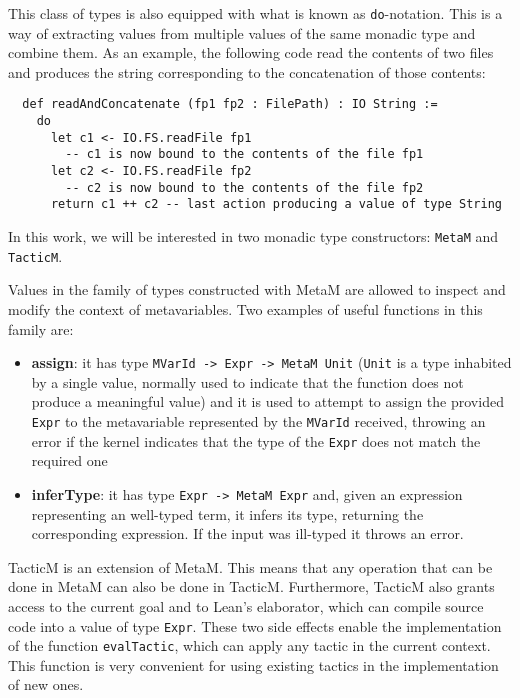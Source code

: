 This class of types is also equipped with what is known as \texttt{do}-notation. This is a way of extracting values from multiple values of the same monadic type and combine them. As an example, the following code read the contents of two files and produces the string corresponding to the concatenation of those contents:

\begin{verbatim}
  def readAndConcatenate (fp1 fp2 : FilePath) : IO String :=
    do
      let c1 <- IO.FS.readFile fp1
        -- c1 is now bound to the contents of the file fp1
      let c2 <- IO.FS.readFile fp2
        -- c2 is now bound to the contents of the file fp2
      return c1 ++ c2 -- last action producing a value of type String
\end{verbatim}

In this work, we will be interested in two monadic type constructors: \texttt{MetaM} and \texttt{TacticM}.

Values in the family of types constructed with MetaM are allowed to inspect and modify the context of metavariables. Two examples of useful functions in this family are:

\begin{itemize}
  \item \textbf{assign}: it has type \texttt{MVarId -\textgreater\ Expr -\textgreater\ MetaM Unit} (\texttt{Unit} is a type inhabited by a single value, normally used to indicate that the function does not produce a meaningful value) and it is used to attempt to assign the provided \texttt{Expr} to the metavariable represented by the \texttt{MVarId} received, throwing an error if the kernel indicates that the type of the \texttt{Expr} does not match the required one
  \item \textbf{inferType}: it has type \texttt{Expr -\textgreater\ MetaM Expr} and, given an expression representing an well-typed term, it infers its type, returning the corresponding expression. If the input was ill-typed it throws an error.
\end{itemize}

TacticM is an extension of MetaM. This means that any operation that can be done in MetaM can also be done in TacticM. Furthermore, TacticM also grants access to the current goal and to Lean's elaborator, which can compile source code into a value of type \texttt{Expr}. These two side effects enable the implementation of the function \texttt{evalTactic}, which can apply any tactic in the current context. This function is very convenient for using existing tactics in the implementation of new ones.

